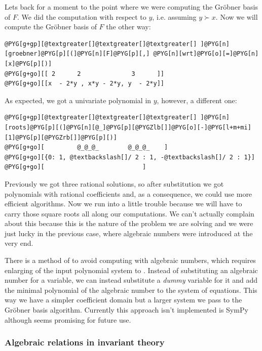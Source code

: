 Lets back for a moment to the point where we were computing the Gröbner basis of $F$. We
did the computation with respect to $y$, i.e. assuming $y \succ x$. Now we will compute the
Gröbner basis of $F$ the other way:

\begin{Verbatim}[commandchars=@\[\]]
@PYG[g+gp][@textgreater[]@textgreater[]@textgreater[] ]@PYG[n][groebner]@PYG[p][(]@PYG[n][F]@PYG[p][,] @PYG[n][wrt]@PYG[o][=]@PYG[n][x]@PYG[p][)]
@PYG[g+go][[ 2      2              3      ]]
@PYG[g+go][[x  - 2*y , x*y - 2*y, y  - 2*y]]
\end{Verbatim}
\noindent
As expected, we got a univariate polynomial in $y$, however, a different one:

\begin{Verbatim}[commandchars=@\[\]]
@PYG[g+gp][@textgreater[]@textgreater[]@textgreater[] ]@PYG[n][roots]@PYG[p][(]@PYG[n][@_]@PYG[p][@PYGZlb[]]@PYG[o][-]@PYG[l+m+mi][1]@PYG[p][@PYGZrb[]]@PYG[p][)]
@PYG[g+go][         @_@_@_        @_@_@_    ]
@PYG[g+go][{0: 1, @textbackslash[]/ 2 : 1, -@textbackslash[]/ 2 : 1}]
@PYG[g+go][                           ]
\end{Verbatim}
\noindent
Previously we got three rational solutions, so after substitution we got polynomials with
rational coefficients and, as a consequence, we could use more efficient algorithms. Now
we run into a little trouble because we will have to carry those square roots all along
our computations. We can't actually complain about this because this is the nature of the
problem we are solving and we were just lucky in the previous case, where algebraic numbers
were introduced at the very end.

There is a method of \cite{Strzebonski1997computing} to avoid computing with algebraic numbers, which
requires enlarging of the input polynomial system to . Instead of substituting
an algebraic number for a variable, we can instead substitute a \emph{dummy} variable for it and add
the minimal polynomial of the algebraic number to the system of equations. This way we have
a simpler coefficient domain but a larger system we pass to the Gröbner basis algorithm.
Currently this approach isn't implemented is SymPy although seems promising for future use.


\subsubsection{Algebraic relations in invariant theory}

